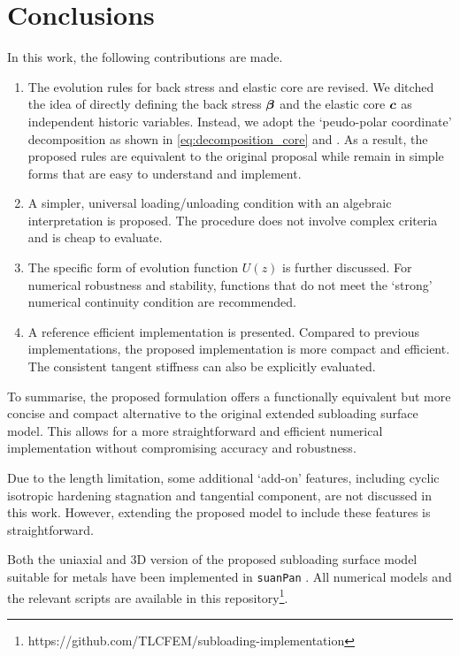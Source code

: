 \section{Conclusions}
In this work, the following contributions are made.
\begin{enumerate}
    \item The evolution rules for back stress and elastic core are revised.
    We ditched the idea of directly defining the back stress $\bm{\beta}$ and the elastic core $\bm{c}$ as independent historic variables.
    Instead, we adopt the `peudo-polar coordinate' decomposition as shown in \eqref{eq:decomposition_core} and .
    As a result, the proposed rules are equivalent to the original proposal while remain in simple forms that are easy to understand and implement.
    \item A simpler, universal loading/unloading condition with an algebraic interpretation is proposed.
    The procedure does not involve complex criteria and is cheap to evaluate.
    \item The specific form of evolution function $U\left(z\right)$ is further discussed.
          For numerical robustness and stability, functions that do not meet the `strong' numerical continuity condition are recommended.
    \item A reference efficient implementation is presented.
    Compared to previous implementations, the proposed implementation is more compact and efficient.
    The consistent tangent stiffness can also be explicitly evaluated.
\end{enumerate}
To summarise, the proposed formulation offers a functionally equivalent but more concise and compact alternative to the original extended subloading surface model.
This allows for a more straightforward and efficient numerical implementation without compromising accuracy and robustness.

Due to the length limitation, some additional `add-on' features, including cyclic isotropic hardening stagnation and tangential component, are not discussed in this work.
However, extending the proposed model to include these features is straightforward.

Both the uniaxial and 3D version of the proposed subloading surface model suitable for metals have been implemented in \texttt{suanPan} \citep{Chang2024}.
All numerical models and the relevant scripts are available in this repository\footnote{https://github.com/TLCFEM/subloading-implementation}.